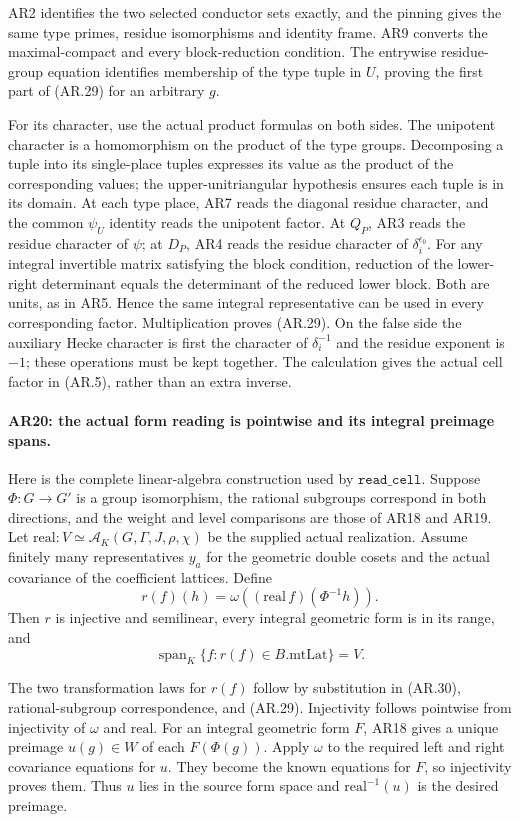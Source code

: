 AR2 identifies the two selected conductor sets exactly, and the
pinning gives the same type primes, residue isomorphisms and
identity frame. AR9 converts the maximal-compact and every
block-reduction condition. The entrywise residue-group equation
identifies membership of the type tuple in $U$, proving the first
part of (AR.29) for an arbitrary $g$.

For its character, use the actual product formulas on both sides.
The unipotent character is a homomorphism on the product of the
type groups. Decomposing a tuple into its single-place tuples
expresses its value as the product of the corresponding values;
the upper-unitriangular hypothesis ensures each tuple is in its
domain. At each type place, AR7 reads the diagonal residue
character, and the common $\psi_U$ identity reads the unipotent
factor. At $Q_P$, AR3 reads the residue character of $\psi$; at
$D_P$, AR4 reads the residue character of $\delta_i^{\epsilon_b}$.
For any integral invertible matrix satisfying the block condition,
reduction of the lower-right determinant equals the determinant
of the reduced lower block. Both are units, as in AR5.
Hence the same integral representative can be used in every
corresponding factor. Multiplication proves (AR.29).
On the false side the auxiliary Hecke character is first the
character of $\delta_i^{-1}$ and the residue exponent is $-1$;
these operations must be kept together. The calculation gives
the actual cell factor in (AR.5), rather than an extra inverse.

\paragraph{AR20: the actual form reading is pointwise and its integral preimage spans.}
Here is the complete linear-algebra construction used by
$\texttt{read\_cell}$. Suppose $\Phi:G\to G'$ is a group isomorphism,
the rational subgroups correspond in both directions, and
the weight and level comparisons are those of AR18 and AR19.
Let
$\mathrm{real}:V\simeq\mathcal A_K(G,\Gamma,J,\rho,\chi)$
be the supplied actual realization. Assume finitely many
representatives $y_a$ for the geometric double cosets and the
actual covariance of the coefficient lattices. Define
\[
 r(f)(h)=\omega((\mathrm{real}\,f)(\Phi^{-1}h)).          \tag{AR.30}
\]
Then $r$ is injective and semilinear, every integral geometric
form is in its range, and
\[
 \operatorname{span}_K\{f:r(f)\in B.\mathrm{mtLat}\}=V.  \tag{AR.31}
\]

The two transformation laws for $r(f)$ follow by substitution in
(AR.30), rational-subgroup correspondence, and (AR.29).
Injectivity follows pointwise from injectivity of $\omega$ and
$\mathrm{real}$. For an integral geometric form $F$, AR18 gives
a unique preimage $u(g)\in W$ of each $F(\Phi(g))$.
Apply $\omega$ to the required left and right covariance
equations for $u$. They become the known equations for $F$, so
injectivity proves them. Thus $u$ lies in the source form space
and $\mathrm{real}^{-1}(u)$ is the desired preimage.

